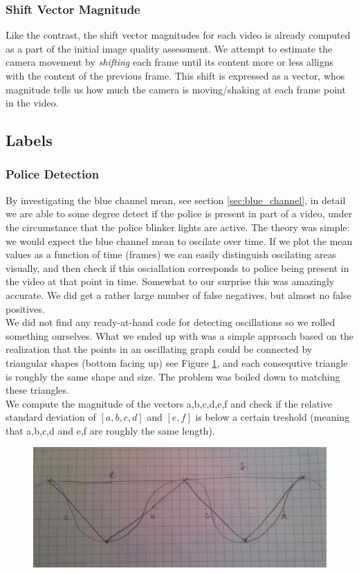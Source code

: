 \subsubsection{Shift Vector Magnitude}
%
Like the contrast, the shift vector magnitudes for each video is already computed as a part of the initial image quality assessment. We attempt to estimate the camera movement by \textit{shifting} each frame until its content more or less alligns with the content of the previous frame. This shift is expressed as a vector, whos magnitude tells us how much the camera is moving/shaking at each frame point in the video.
%
\subsection{Labels}
%

%
\subsubsection{Police Detection}\label{sec:police_detection}
%
By investigating the blue channel mean, see section \ref{sec:blue_channel}, in detail we are able to some degree detect if the police is present in part of a video, under the circumstance that the police blinker lights are active. The theory was simple: we would expect the blue channel mean to oscilate over time. If we plot the mean values as a function of time (frames) we can easily distinguish oscilating areas visually, and then check if this osciallation corresponds to police being present in the video at that point in time. Somewhat to our surprise this was amazingly accurate. We did get a rather large number of false negatives, but almost no false positives.\\
We did not find any ready-at-hand code for detecting oscillations so we rolled something ourselves. What we ended up with was a simple approach based on the realization that the points in an oscillating graph could be connected by triangular shapes (bottom facing up) see Figure \ref{fig:triangles}, and each consequtive triangle is roughly the same shape and size. The problem was boiled down to matching these triangles.\\
We compute the magnitude of the vectors a,b,c,d,e,f and check if the relative standard deviation of $[a,b,c,d]$ and $[e,f]$ is below a certain treshold (meaning that a,b,c,d and e,f are roughly the same length).
%
\begin{figure}
     \centering
     \includegraphics[width=1.05\textwidth]{img/triangles.jpg}
     \caption{}\label{fig:triangles}
\end{figure}
% 
%
